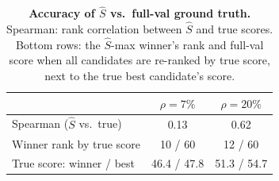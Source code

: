 \begin{table}
\vspace{0pt}
\centering
\caption{\textbf{Accuracy of $\hat{S}$ vs.\ full-val ground truth.}
Spearman: rank correlation between $\hat{S}$ and true scores.
Bottom rows: the $\hat{S}$-max winner's rank and full-val score when all
candidates are re-ranked by true score, next to the true best candidate's
score.}
\label{table:est_accuracy}
\small
\setlength{\tabcolsep}{3pt}
\begin{tabular}{lcc}
\toprule
 & $\rho{=}7\%$ & $\rho{=}20\%$ \\
\midrule
Spearman ($\hat{S}$ vs.\ true) & 0.13 & 0.62 \\
Winner rank by true score & 10 / 60 & 12 / 60 \\
True score: winner / best & 46.4 / 47.8 & 51.3 / 54.7 \\
\bottomrule
\end{tabular}
\vspace{-8pt}
\end{table}